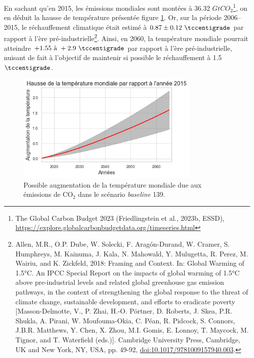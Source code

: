 \documentclass[a4,11pt]{aleph-notas}
\begin{document}
En sachant qu'en 2015, les émissions mondiales sont montées à 36.32 $GtCO_2$\footnote{The Global Carbon Budget 2023 (Friedlingstein et al., 2023b, ESSD), \url{https://explore.globalcarbonbudgetdata.org/timeseries.html}}, on en déduit la hausse de température présentée figure \ref{fig:temperature_baseline}. Or, sur la période 2006–2015, le réchauffement climatique était estimé à $0.87 \pm 0.12 ~ \tccentigrade$ par rapport à l'ère pré-industrielle\footnote{Allen, M.R., O.P. Dube, W. Solecki, F. Aragón-Durand, W. Cramer, S. Humphreys, M. Kainuma, J. Kala, N. Mahowald, Y. Mulugetta, R. Perez, M. Wairiu, and K. Zickfeld, 2018: Framing and Context. In: Global Warming of 1.5°C. An IPCC Special Report on the impacts of global warming of 1.5°C above pre-industrial levels and related global greenhouse gas emission pathways, in the context of strengthening the global response to the threat of climate change, sustainable development, and efforts to eradicate poverty [Masson-Delmotte, V., P. Zhai, H.-O. Pörtner, D. Roberts, J. Skea, P.R. Shukla, A. Pirani, W. Moufouma-Okia, C. Péan, R. Pidcock, S. Connors, J.B.R. Matthews, Y. Chen, X. Zhou, M.I. Gomis, E. Lonnoy, T. Maycock, M. Tignor, and T. Waterfield (eds.)]. Cambridge University Press, Cambridge, UK and New York, NY, USA, pp. 49-92, \url{doi:10.1017/9781009157940.003}.}. Ainsi, en 2060, la température mondiale pourrait atteindre $+ 1.55 \text{ à } +2.9 ~ \tccentigrade$ par rapport à l'ère pré-industrielle, nuisant de fait à l'objectif de maintenir si possible le réchauffement à 1.5 $\tccentigrade$.

\begin{figure}[H]
    \centering
    \includegraphics[width=0.8\textwidth]{images_IMACLIM/temperature_baseline.png}
    \caption{Possible augmentation de la température mondiale due aux émissions de CO$_2$ dans le scénario \textit{baseline} 139.}
    \label{fig:temperature_baseline}
\end{figure}
\end{document}
